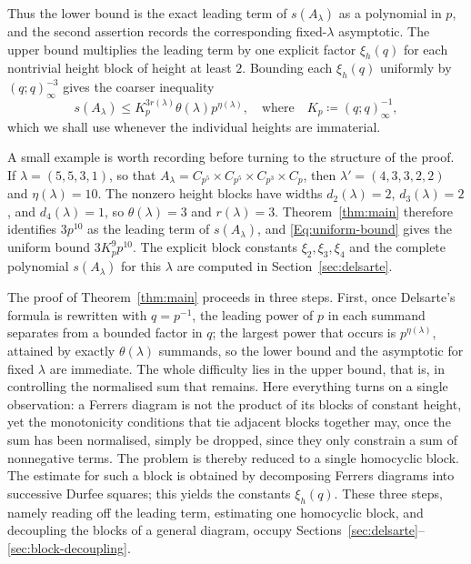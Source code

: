 \documentclass[a4paper,11pt,reqno]{amsart}
\theoremstyle{plain}
\theoremstyle{remark}
\numberwithin{equation}{section}
\renewcommand{\leq}{\leqslant}
\begin{document}
Thus the lower bound is the exact leading term of $s(A_\lambda)$ as a
polynomial in $p$, and the second assertion records the corresponding
fixed-$\lambda$ asymptotic. The upper bound
multiplies the leading term by one explicit factor $\xi_h(q)$ for each
nontrivial height block of height at least $2$. Bounding each $\xi_h(q)$
uniformly by $(q;q)_\infty^{-3}$ gives the coarser inequality
\begin{equation}\label{Eq:uniform-bound}
        s(A_\lambda)
        \leq
        K_p^{3r(\lambda)}\theta(\lambda)p^{\eta(\lambda)},
        \quad \text{where} \quad
        K_p\coloneqq(q;q)_\infty^{-1},
\end{equation}
which we shall use whenever the individual heights are immaterial.

A small example is worth recording before turning to the structure of the proof.
If $\lambda=(5,5,3,1)$, so that
$A_\lambda=C_{p^5}\times C_{p^5}\times C_{p^3}\times C_p$, then
$\lambda'=(4,3,3,2,2)$ and $\eta(\lambda)=10$.
The nonzero height blocks 
have widths $d_2(\lambda)=2$, $d_3(\lambda)=2$, and $d_4(\lambda)=1$, 
so $\theta(\lambda)=3$ and $r(\lambda)=3$.
Theorem~\ref{thm:main} therefore identifies $3p^{10}$ as the leading term
of $s(A_\lambda)$, and \eqref{Eq:uniform-bound} gives the uniform bound
$3K_p^9p^{10}$. The explicit block constants $\xi_2,\xi_3,\xi_4$ and the
complete polynomial $s(A_\lambda)$ for this $\lambda$ are computed in
Section~\ref{sec:delsarte}.

The proof of Theorem~\ref{thm:main} proceeds in three steps. First, once
Delsarte's formula is rewritten with $q=p^{-1}$, the leading power of $p$
in each summand separates from a bounded factor in $q$; the largest power
that occurs is $p^{\eta(\lambda)}$, attained by exactly $\theta(\lambda)$
summands, so the lower bound and the asymptotic for fixed $\lambda$ are immediate.
The whole difficulty lies in the upper bound, that is, in controlling the
normalised sum that remains. Here everything turns on a single observation:
a Ferrers diagram is not the product of its blocks of constant height, yet
the monotonicity conditions that tie adjacent blocks together may, once the
sum has been normalised, simply be dropped, since they only constrain a sum
of nonnegative terms. The problem is thereby reduced to a single homocyclic block. 
The estimate for such a block is obtained by decomposing Ferrers diagrams 
into successive Durfee squares; this yields the constants $\xi_h(q)$. 
These three steps, namely reading off the leading term,
estimating one homocyclic block, and decoupling the blocks of a general
diagram, occupy Sections~\ref{sec:delsarte}--\ref{sec:block-decoupling}.
\end{document}

